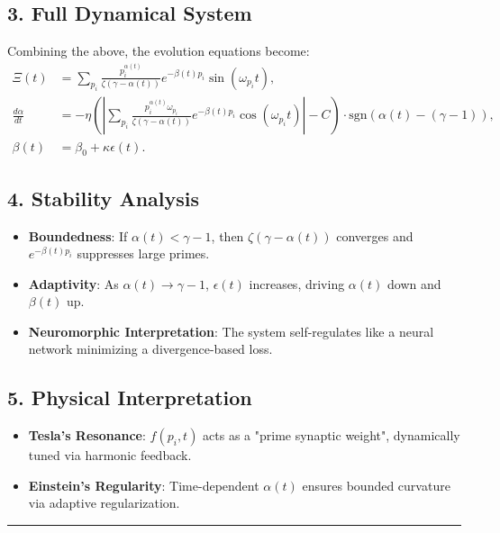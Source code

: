 \documentclass[12pt]{article}
\theoremstyle{plain}
\begin{document}
\subsection*{3. Full Dynamical System}

Combining the above, the evolution equations become:
\[
\begin{aligned}
\Xi(t) &= \sum_{p_i} \frac{p_i^{\alpha(t)}}{\zeta(\gamma - \alpha(t))} e^{-\beta(t) p_i} \sin(\omega_{p_i} t), \\
\frac{d\alpha}{dt} &= -\eta \left( \left| \sum_{p_i} \frac{p_i^{\alpha(t)} \omega_{p_i}}{\zeta(\gamma - \alpha(t))} e^{-\beta(t) p_i} \cos(\omega_{p_i} t) \right| - C \right) \cdot \text{sgn}(\alpha(t) - (\gamma - 1)), \\
\beta(t) &= \beta_0 + \kappa \epsilon(t).
\end{aligned}
\]

\subsection*{4. Stability Analysis}

\begin{itemize}
    \item \textbf{Boundedness}: If \( \alpha(t) < \gamma - 1 \), then \( \zeta(\gamma - \alpha(t)) \) converges and \( e^{-\beta(t) p_i} \) suppresses large primes.
    \item \textbf{Adaptivity}: As \( \alpha(t) \to \gamma - 1 \), \( \epsilon(t) \) increases, driving \( \alpha(t) \) down and \( \beta(t) \) up.
    \item \textbf{Neuromorphic Interpretation}: The system self-regulates like a neural network minimizing a divergence-based loss.
\end{itemize}

\subsection*{5. Physical Interpretation}

\begin{itemize}
    \item \textbf{Tesla’s Resonance}: \( f(p_i, t) \) acts as a "prime synaptic weight", dynamically tuned via harmonic feedback.
    \item \textbf{Einstein’s Regularity}: Time-dependent \( \alpha(t) \) ensures bounded curvature via adaptive regularization.
\end{itemize}

\vspace{1em}
\hrule
\vspace{1em}
\end{document}
